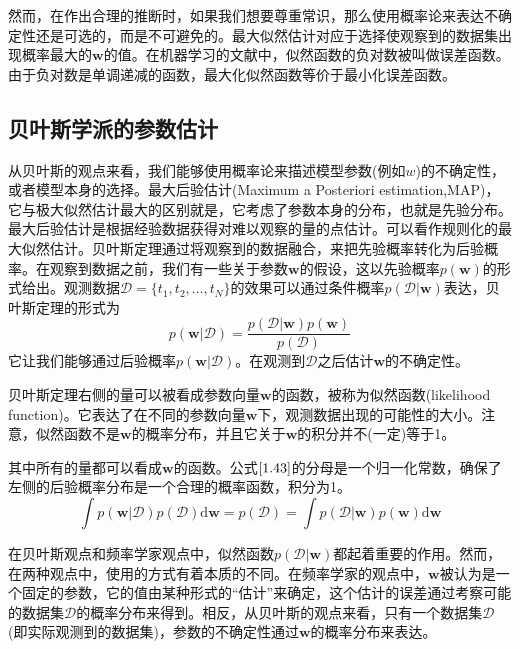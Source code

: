 然而，在作出合理的推断时，如果我们想要尊重常识，那么使用概率论来表达不确定性还是可选的，而是不可避免的。最大似然估计对应于选择使观察到的数据集出现概率最大的$\boldsymbol{w}$的值。在机器学习的文献中，似然函数的负对数被叫做误差函数。由于负对数是单调递减的函数，最大化似然函数等价于最小化误差函数。
\subsection*{贝叶斯学派的参数估计}
从贝叶斯的观点来看，我们能够使用概率论来描述模型参数(例如$w$)的不确定性，或者模型本身的选择。最大后验估计(Maximum a Posteriori estimation,MAP)，它与极大似然估计最大的区别就是，它考虑了参数本身的分布，也就是先验分布。最大后验估计是根据经验数据获得对难以观察的量的点估计。可以看作规则化的最大似然估计。贝叶斯定理通过将观察到的数据融合，来把先验概率转化为后验概率。在观察到数据之前，我们有一些关于参数$\boldsymbol{w}$的假设，这以先验概率$p(\boldsymbol{w})$的形式给出。观测数据$\mathcal{D}=\{t_1,t_2,\dots,t_N \}$的效果可以通过条件概率$p(\mathcal{D}|\boldsymbol{w})$表达，贝叶斯定理的形式为
\begin{equation}
\label{1.43}
	p(\boldsymbol{w}|\mathcal{D})=\frac{p(\mathcal{D}|\boldsymbol{w})p(\boldsymbol{w})}{p(\mathcal{D})}
\end{equation}
它让我们能够通过后验概率$p(\boldsymbol{w}|\mathcal{D})$。在观测到$\mathcal{D}$之后估计$\boldsymbol{w}$的不确定性。

贝叶斯定理右侧的量可以被看成参数向量$\boldsymbol{w}$的函数，被称为似然函数(likelihood function)。它表达了在不同的参数向量$\boldsymbol{w}$下，观测数据出现的可能性的大小。注意，似然函数不是$\boldsymbol{w}$的概率分布，并且它关于$\boldsymbol{w}$的积分并不(一定)等于1。

其中所有的量都可以看成$\boldsymbol{w}$的函数。公式$\ref{1.43}$的分母是一个归一化常数，确保了左侧的后验概率分布是一个合理的概率函数，积分为1。
\begin{equation}
	\int p(\boldsymbol{w}|\mathcal{D})p(\mathcal{D})\mathrm{d}\boldsymbol{w}=p(\mathcal{D})=\int p(\mathcal{D}|\boldsymbol{w})p(\boldsymbol{w})\mathrm{d}\boldsymbol{w}
\end{equation}

在贝叶斯观点和频率学家观点中，似然函数$p(\mathcal{D}|\boldsymbol{w})$都起着重要的作用。然而，在两种观点中，使用的方式有着本质的不同。在频率学家的观点中，$\boldsymbol{w}$被认为是一个固定的参数，它的值由某种形式的“估计”来确定，这个估计的误差通过考察可能的数据集$\mathcal{D}$的概率分布来得到。相反，从贝叶斯的观点来看，只有一个数据集$\mathcal{D}$(即实际观测到的数据集)，参数的不确定性通过$\boldsymbol{w}$的概率分布来表达。

